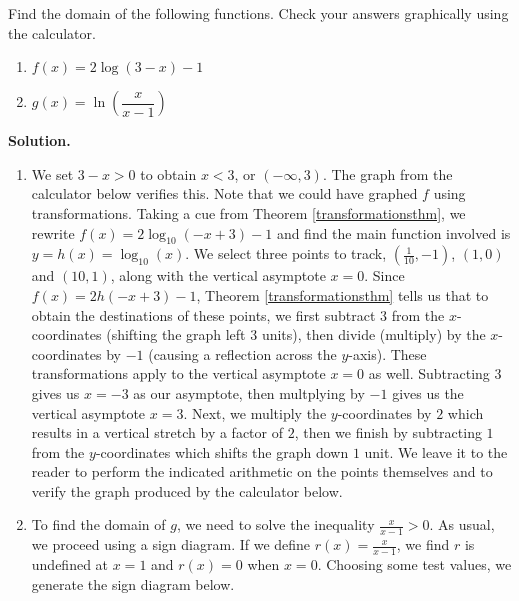 \begin{ex}  Find the domain of the following functions.  Check your answers graphically using the calculator.

\begin{multicols}{2}
\begin{enumerate}

\item  $f(x) = 2\log(3-x)-1$

\item  $g(x) = \ln \left(\dfrac{x}{x-1}\right)$

\end{enumerate}
\end{multicols}

{\bf Solution.}

\begin{enumerate}

\item  We set $3-x > 0$ to obtain $x<3$, or $(-\infty, 3)$.  The graph from the calculator below verifies this.  Note that we could have graphed $f$ using transformations.  Taking a cue from Theorem \ref{transformationsthm}, we rewrite $f(x) = 2 \log_{10}(-x+3) -1$ and find the main function involved is $y = h(x) = \log_{10}(x)$.  We select three points to track,  $\left(\frac{1}{10}, -1\right)$, $(1,0)$ and $(10,1)$, along with the vertical asymptote $x=0$.   Since $f(x) = 2h(-x+3)-1$, Theorem \ref{transformationsthm} tells us that to obtain the destinations of these points, we first subtract $3$ from the $x$-coordinates (shifting the graph left $3$ units), then divide (multiply) by the $x$-coordinates by $-1$ (causing a reflection across the $y$-axis).  These transformations apply to the vertical asymptote $x = 0$ as well.  Subtracting $3$ gives us $x=-3$ as our asymptote, then multplying by $-1$ gives us the vertical asymptote $x=3$.  Next, we multiply the $y$-coordinates by $2$ which results in a vertical stretch by a factor of $2$, then we finish by subtracting $1$ from the $y$-coordinates which shifts the graph down $1$ unit.  We leave it to the reader to perform the indicated arithmetic on the points themselves and to verify the graph produced by the calculator below.


\item  To find the domain of $g$, we need to solve the inequality $\frac{x}{x-1} > 0$. As usual, we proceed using a sign diagram.  If we define $r(x) = \frac{x}{x-1}$, we find $r$ is undefined at $x=1$ and $r(x) = 0$ when $x=0$.  Choosing some test values, we generate the sign diagram below.  


\end{enumerate}
\end{ex}
